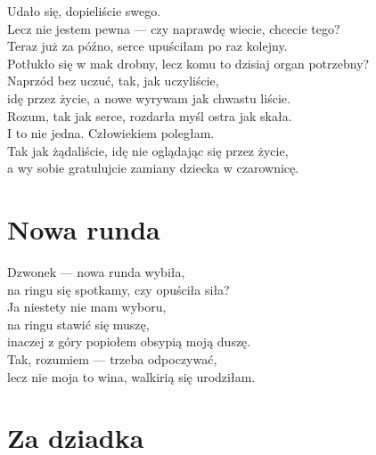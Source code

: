 \documentclass[12pt, a4paper]{memoir}
\renewenvironment{verse}{%
  \par\vspace{\baselineskip}\raggedright
}{
  \par\vspace{\baselineskip}
}
\begin{document}
\begin{verse}
Udało się, dopieliście swego.\\
Lecz nie jestem pewna --- czy naprawdę wiecie, chcecie tego?\\[\baselineskip]

Teraz już za późno, serce upuściłam po raz kolejny.\\
Potłukło się w mak drobny, lecz komu to dzisiaj organ potrzebny?\\[\baselineskip]

Naprzód bez uczuć, tak, jak uczyliście,\\
idę przez życie, a nowe wyrywam jak chwastu liście.\\[\baselineskip]

Rozum, tak jak serce, rozdarła myśl ostra jak skała.\\
I to nie jedna. Człowiekiem poległam.\\[\baselineskip]

Tak jak żądaliście, idę nie oglądając się przez życie,\\
a wy sobie gratulujcie zamiany dziecka w czarownicę.
\end{verse}

\clearpage

\section{Nowa runda}

\begin{verse}
Dzwonek --- nowa runda wybiła,\\
na ringu się spotkamy, czy opuściła siła?\\[\baselineskip]

Ja niestety nie mam wyboru,\\
na ringu stawić się muszę,\\
inaczej z góry popiołem obsypią moją duszę.\\[\baselineskip]

Tak, rozumiem --- trzeba odpoczywać,\\
lecz nie moja to wina, walkirią się urodziłam.
\end{verse}

\clearpage

\section{Za dziadka}
\end{document}
